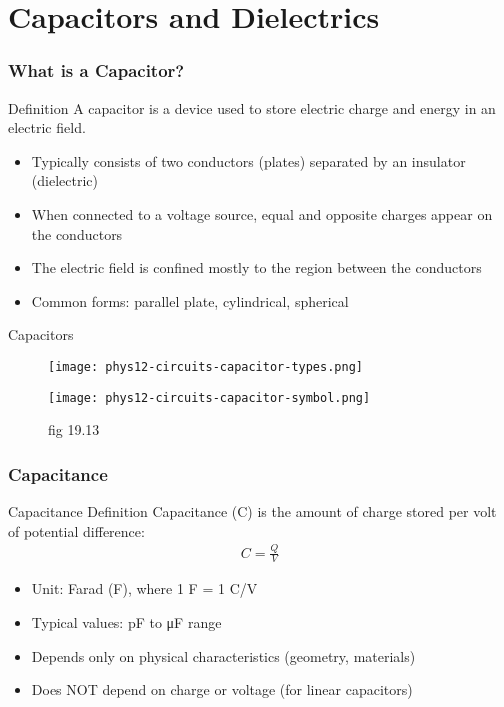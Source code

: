 \documentclass{beamer}
\begin{document}
\section{Capacitors and Dielectrics}

\begin{frame}
    \frametitle{What is a Capacitor?}
    
    \begin{block}{Definition}
        A capacitor is a device used to store electric charge and energy in an electric field.
    \end{block}
    
    \begin{itemize}
        \item Typically consists of two conductors (plates) separated by an insulator (dielectric)
        \item When connected to a voltage source, equal and opposite charges appear on the conductors
        \item The electric field is confined mostly to the region between the conductors
        \item Common forms: parallel plate, cylindrical, spherical
    \end{itemize}
    \end{frame}

\begin{frame}{Capacitors}
    \begin{figure}
        \centering
        \texttt{[image: phys12-circuits-capacitor-types.png]}
    \end{figure}
\end{frame}

\begin{frame}
   \begin{figure}
       \centering
       \texttt{[image: phys12-circuits-capacitor-symbol.png]}
       \caption{fig 19.13}
   \end{figure}
\end{frame}

\begin{frame}
    \frametitle{Capacitance}
    
    \begin{block}{Capacitance Definition}
        Capacitance (C) is the amount of charge stored per volt of potential difference:
        \begin{align}
            C = \frac{Q}{V}
        \end{align}
    \end{block}
    
    \begin{itemize}
        \item Unit: Farad (F), where 1 F = 1 C/V
        \item Typical values: pF to μF range
        \item Depends only on physical characteristics (geometry, materials)
        \item Does NOT depend on charge or voltage (for linear capacitors)
    \end{itemize}
\end{frame}
\end{document}
